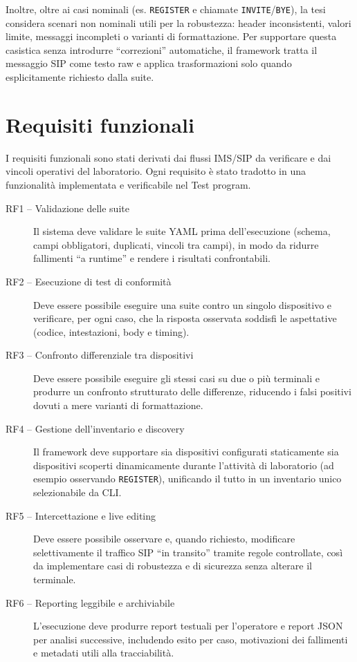 Inoltre, oltre ai casi nominali (es. \texttt{REGISTER} e chiamate \texttt{INVITE}/\texttt{BYE}), la tesi considera scenari non nominali utili per la robustezza: header inconsistenti, valori limite, messaggi incompleti o varianti di formattazione. Per supportare questa casistica senza introdurre ``correzioni'' automatiche, il framework tratta il messaggio SIP come testo raw e applica trasformazioni solo quando esplicitamente richiesto dalla suite.

\section{Requisiti funzionali}
I requisiti funzionali sono stati derivati dai flussi IMS/SIP da verificare e dai vincoli operativi del laboratorio. Ogni requisito \`e stato tradotto in una funzionalit\`a implementata e verificabile nel Test program.

\begin{description}
	\item[RF1 -- Validazione delle suite] Il sistema deve validare le suite YAML prima dell'esecuzione (schema, campi obbligatori, duplicati, vincoli tra campi), in modo da ridurre fallimenti ``a runtime'' e rendere i risultati confrontabili.
	\item[RF2 -- Esecuzione di test di conformit\`a] Deve essere possibile eseguire una suite contro un singolo dispositivo e verificare, per ogni caso, che la risposta osservata soddisfi le aspettative (codice, intestazioni, body e timing).
	\item[RF3 -- Confronto differenziale tra dispositivi] Deve essere possibile eseguire gli stessi casi su due o pi\`u terminali e produrre un confronto strutturato delle differenze, riducendo i falsi positivi dovuti a mere varianti di formattazione.
	\item[RF4 -- Gestione dell'inventario e discovery] Il framework deve supportare sia dispositivi configurati staticamente sia dispositivi scoperti dinamicamente durante l'attivit\`a di laboratorio (ad esempio osservando \texttt{REGISTER}), unificando il tutto in un inventario unico selezionabile da CLI.
	\item[RF5 -- Intercettazione e live editing] Deve essere possibile osservare e, quando richiesto, modificare selettivamente il traffico SIP ``in transito'' tramite regole controllate, cos\`i da implementare casi di robustezza e di sicurezza senza alterare il terminale.
	\item[RF6 -- Reporting leggibile e archiviabile] L'esecuzione deve produrre report testuali per l'operatore e report JSON per analisi successive, includendo esito per caso, motivazioni dei fallimenti e metadati utili alla tracciabilit\`a.
\end{description}


